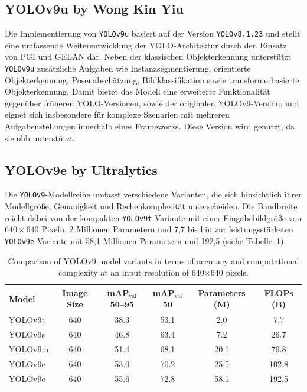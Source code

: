 
\subsection{YOLOv9u by Wong Kin Yiu}
\label{subsec:yolov9u}

Die Implementierung von \texttt{YOLOv9u} basiert auf der Version \texttt{YOLOv8.1.23}\cite{yolo_v9u_github} und stellt eine umfassende Weiterentwicklung der \acrshort{YOLO}-Architektur durch den Einsatz von \acrshort{PGI} und \acrshort{GELAN} dar. Neben der klassischen Objekterkennung unterstützt \texttt{YOLOv9u} zusätzliche Aufgaben wie Instanzsegmentierung, orientierte Objekterkennung, Posenabschätzung, Bildklassifikation sowie transformerbasierte Objekterkennung\cite{wang2024}. Damit bietet das Modell eine erweiterte Funktionalität gegenüber früheren \acrshort{YOLO}-Versionen, sowie der originalen \acrshort{YOLO}v9-Version, und eignet sich insbesondere für komplexe Szenarien mit mehreren Aufgabenstellungen innerhalb eines Frameworks. Diese Version wird genutzt, da sie \acrlong{obb} unterstützt.

\subsection{YOLOv9e by Ultralytics}
\label{subsec:yolov9e}

Die \texttt{YOLOv9}-Modellreihe umfasst verschiedene Varianten, die sich hinsichtlich ihrer Modellgröße, Genauigkeit und Rechenkomplexität unterscheiden. Die Bandbreite reicht dabei von der kompakten \texttt{YOLOv9t}-Variante mit einer Eingabebildgröße von $640 \times 640$ Pixeln, 2 Millionen Parametern und 7{,}7  bis hin zur leistungsstärksten \texttt{YOLOv9e}-Variante mit 58{,}1 Millionen Parametern und 192{,}5  (siehe Tabelle~\ref{tab:yolov9-models}). 
\begin{table}[h]
\centering
\begin{tabular}{l|c|c|c|c|c} %
\textbf{Model} & \textbf{Image Size} & \textbf{mAP$_{\text{val}}$ 50--95} & \textbf{mAP$_{\text{val}}$ 50} & \textbf{Parameters (M)} & \textbf{FLOPs (B)} \\
\hline
YOLOv9t & 640 & 38.3 & 53.1 & 2.0 & 7.7 \\
YOLOv9s & 640 & 46.8 & 63.4 & 7.2 & 26.7 \\
YOLOv9m & 640 & 51.4 & 68.1 & 20.1 & 76.8 \\
YOLOv9c & 640 & 53.0 & 70.2 & 25.5 & 102.8 \\
YOLOv9e & 640 & 55.6 & 72.8 & 58.1 & 192.5 \\
\end{tabular}
\caption{Comparison of YOLOv9 model variants in terms of accuracy and computational complexity at an input resolution of 640$\times$640 pixels.}
\label{tab:yolov9-models}
\end{table}



